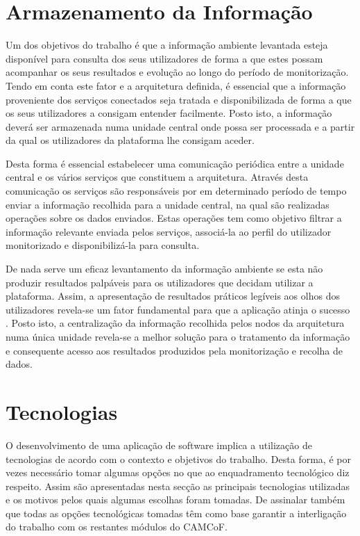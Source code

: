 \section{Armazenamento da Informação}

Um dos objetivos do trabalho é que a informação ambiente levantada esteja disponível para consulta dos seus utilizadores de forma a que estes possam acompanhar os seus resultados e evolução ao longo do período de monitorização. Tendo em conta este fator e a arquitetura definida, é essencial que a informação proveniente dos serviços conectados seja tratada e disponibilizada de forma a que os seus utilizadores a consigam entender facilmente. Posto isto, a informação deverá ser armazenada numa unidade central onde possa ser processada e a partir da qual os utilizadores da plataforma lhe consigam aceder.

Desta forma é essencial estabelecer uma comunicação periódica entre a unidade central e os vários serviços que constituem a arquitetura. Através desta comunicação os serviços são responsáveis por em determinado período de tempo enviar a informação recolhida para a unidade central, na qual são realizadas operações sobre os dados enviados. Estas operações tem como objetivo filtrar a informação relevante enviada pelos serviços, associá-la ao perfil do utilizador monitorizado e disponibilizá-la para consulta. 

De nada serve um eficaz levantamento da informação ambiente se esta não produzir resultados palpáveis para os utilizadores que decidam utilizar a plataforma. Assim, a apresentação de resultados práticos legíveis aos olhos dos utilizadores revela-se um fator fundamental para que a aplicação atinja o sucesso \cite{fernandes1995global}. Posto isto, a centralização da informação recolhida pelos nodos da arquitetura numa única unidade revela-se a melhor solução para o tratamento da informação e consequente acesso aos resultados produzidos pela monitorização e recolha de dados.



\section{Tecnologias}

O desenvolvimento de uma aplicação de software implica a utilização de tecnologias de acordo com o contexto e objetivos do trabalho. Desta forma, é por vezes necessário tomar algumas opções no que ao enquadramento tecnológico diz respeito. Assim são apresentadas nesta secção as principais tecnologias utilizadas e os motivos pelos quais algumas escolhas foram tomadas. De assinalar também que todas as opções tecnológicas tomadas têm como base garantir a interligação do trabalho com os restantes módulos do CAMCoF.

